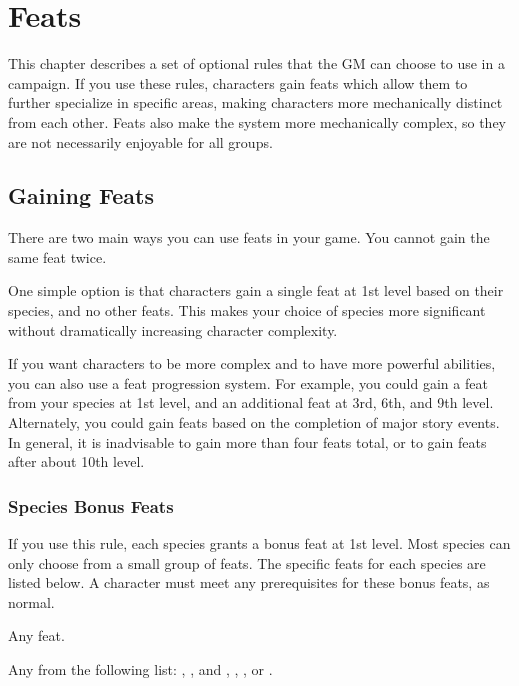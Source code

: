\chapter{Feats}\label{Feats}

This chapter describes a set of optional rules that the GM can choose to use in a campaign.
If you use these rules, characters gain feats which allow them to further specialize in specific areas, making characters more mechanically distinct from each other.
Feats also make the system more mechanically complex, so they are not necessarily enjoyable for all groups.

\section{Gaining Feats}
  There are two main ways you can use feats in your game.
  You cannot gain the same feat twice.

  One simple option is that characters gain a single feat at 1st level based on their species, and no other feats.
  This makes your choice of species more significant without dramatically increasing character complexity.

  If you want characters to be more complex and to have more powerful abilities, you can also use a feat progression system.
  For example, you could gain a feat from your species at 1st level, and an additional feat at 3rd, 6th, and 9th level.
  Alternately, you could gain feats based on the completion of major story events.
  In general, it is inadvisable to gain more than four feats total, or to gain feats after about 10th level.

  \subsection{Species Bonus Feats}\label{Species Bonus Feats}
    If you use this rule, each species grants a bonus feat at 1st level.
    Most species can only choose from a small group of feats.
    The specific feats for each species are listed below.
    A character must meet any prerequisites for these bonus feats, as normal.

     Any feat.

     Any from the following list: , ,  and , , , or .

